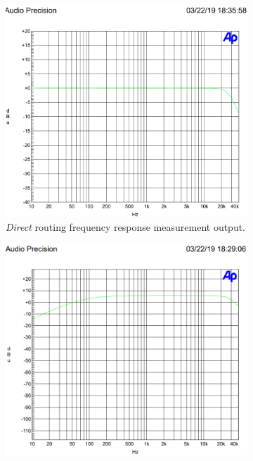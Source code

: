 		\begin{figure}[!htbp]
			\centering
			\begin{subfigure}{0.6\textwidth}
				\includegraphics[width = \textwidth]{FinalImages/FR_direct.png}
				\caption{\emph{Direct} routing frequency response measurement output.}
				\label{fig:FR_AP_direct}
			\end{subfigure}
			\begin{subfigure}{0.6\textwidth}
				\includegraphics[width = \textwidth]{FinalImages/FR_sum.png}

\end{subfigure}
\end{figure}

